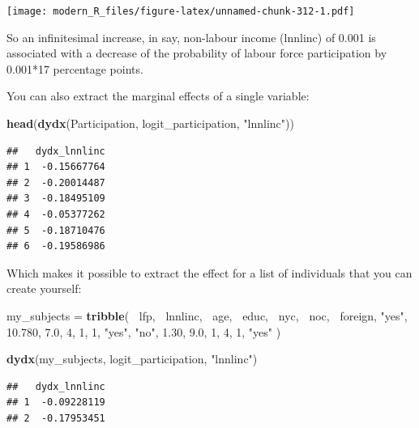 \documentclass[]{gitbook}
\newenvironment{Shaded}{\begin{snugshade}}{\end{snugshade}}
\newcommand{\DecValTok}[1]{\textcolor[rgb]{0.00,0.00,0.81}{#1}}
\newcommand{\FloatTok}[1]{\textcolor[rgb]{0.00,0.00,0.81}{#1}}
\newcommand{\KeywordTok}[1]{\textcolor[rgb]{0.13,0.29,0.53}{\textbf{#1}}}
\newcommand{\NormalTok}[1]{#1}
\newcommand{\OperatorTok}[1]{\textcolor[rgb]{0.81,0.36,0.00}{\textbf{#1}}}
\newcommand{\StringTok}[1]{\textcolor[rgb]{0.31,0.60,0.02}{#1}}
\theoremstyle{definition}
\theoremstyle{definition}
\theoremstyle{definition}
\theoremstyle{remark}
\begin{document}
\texttt{[image: modern\_R\_files/figure-latex/unnamed-chunk-312-1.pdf]}

So an infinitesimal increase, in say, non-labour income (lnnlinc) of
0.001 is associated with a decrease of the probability of labour force
participation by 0.001*17 percentage points.

You can also extract the marginal effects of a single variable:

\begin{Shaded}
\begin{Highlighting}[]
\KeywordTok{head}\NormalTok{(}\KeywordTok{dydx}\NormalTok{(Participation, logit_participation, }\StringTok{"lnnlinc"}\NormalTok{))}
\end{Highlighting}
\end{Shaded}

\begin{verbatim}
##   dydx_lnnlinc
## 1  -0.15667764
## 2  -0.20014487
## 3  -0.18495109
## 4  -0.05377262
## 5  -0.18710476
## 6  -0.19586986
\end{verbatim}

Which makes it possible to extract the effect for a list of individuals
that you can create yourself:

\begin{Shaded}
\begin{Highlighting}[]
\NormalTok{my_subjects =}\StringTok{ }\KeywordTok{tribble}\NormalTok{(}
    \OperatorTok{~}\NormalTok{lfp,  }\OperatorTok{~}\NormalTok{lnnlinc, }\OperatorTok{~}\NormalTok{age, }\OperatorTok{~}\NormalTok{educ, }\OperatorTok{~}\NormalTok{nyc, }\OperatorTok{~}\NormalTok{noc, }\OperatorTok{~}\NormalTok{foreign,}
    \StringTok{"yes"}\NormalTok{,   }\FloatTok{10.780}\NormalTok{,  }\FloatTok{7.0}\NormalTok{,     }\DecValTok{4}\NormalTok{,    }\DecValTok{1}\NormalTok{,   }\DecValTok{1}\NormalTok{,     }\StringTok{"yes"}\NormalTok{,}
     \StringTok{"no"}\NormalTok{,     }\FloatTok{1.30}\NormalTok{,  }\FloatTok{9.0}\NormalTok{,     }\DecValTok{1}\NormalTok{,    }\DecValTok{4}\NormalTok{,   }\DecValTok{1}\NormalTok{,     }\StringTok{"yes"}
\NormalTok{)}

\KeywordTok{dydx}\NormalTok{(my_subjects, logit_participation, }\StringTok{"lnnlinc"}\NormalTok{)}
\end{Highlighting}
\end{Shaded}

\begin{verbatim}
##   dydx_lnnlinc
## 1  -0.09228119
## 2  -0.17953451
\end{verbatim}
\end{document}
